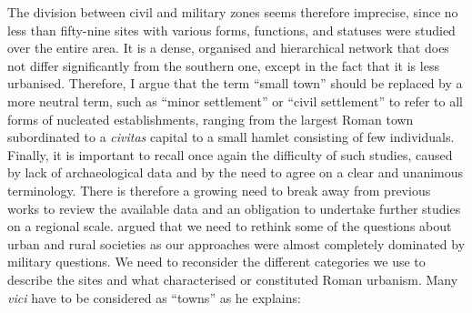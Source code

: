 The division between civil and military zones seems therefore imprecise, since no less than fifty-nine sites with various forms, functions, and statuses were studied over the entire area. It is a dense, organised and hierarchical network that does not differ significantly from the southern one, except in the fact that it is less urbanised. Therefore, I argue that the term “small town” should be replaced by a more neutral term, such as “minor settlement” or “civil settlement” to refer to all forms of nucleated establishments, ranging from the largest Roman town subordinated to a \textit{civitas} capital to a small hamlet consisting of few individuals. Finally, it is important to recall once again the difficulty of such studies, caused by lack of archaeological data and by the need to agree on a clear and unanimous terminology. There is therefore a growing need to break away from previous works to review the available data and an obligation to undertake further studies on a regional scale. \textcite[66]{Millett_2001} argued that we need to rethink some of the questions about urban and rural societies as our approaches were almost completely dominated by military questions. We need to reconsider the different categories we use to describe the sites and what characterised or constituted Roman urbanism. Many \textit{vici} have to be considered as “towns” as he explains: 

